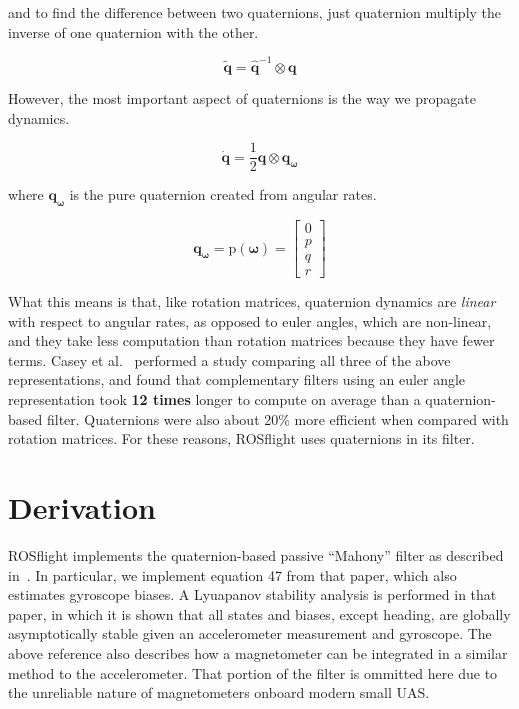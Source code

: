 \documentclass[paper=a4, fontsize=11pt]{scrartcl} %
\numberwithin{equation}{section} %
\numberwithin{figure}{section} %
\numberwithin{table}{section} %
\begin{document}
and to find the difference between two quaternions, just quaternion multiply the inverse of one quaternion with the other.

\begin{equation}
	\tilde{\bm{q}} = \hat{\bm{q}}^{-1} \otimes \bm{q}
\end{equation}

However, the most important aspect of quaternions is the way we propagate dynamics.

\begin{equation}
	\dot{\bm{q}} = \frac{1}{2} \bm{q} \otimes \bm{q_{\omega}}
\end{equation}

where $\bm{q_{\omega}}$ is the pure quaternion created from angular rates.

\begin{equation}
	\bm{q_{\omega}} = \textrm{p}(\bm{\omega}) =
			  \begin{bmatrix}
				0 \\
				p \\
				q \\
				r
			 \end{bmatrix}
\end{equation}

What this means is that, like rotation matrices, quaternion dynamics are \textit{linear} with respect to angular rates, as opposed to euler angles, which are non-linear, and they take less computation than rotation matrices because they have fewer terms.  Casey et al.~\cite{Casey2013} performed a study comparing all three of the above representations, and found that complementary filters using an euler angle representation took \textbf{12 times} longer to compute on average than a quaternion-based filter.  Quaternions were also about 20\% more efficient when compared with rotation matrices.  For these reasons, ROSflight uses quaternions in its filter.

\section{Derivation}

ROSflight implements the quaternion-based passive ``Mahony'' filter as described in~\cite{Mahony2007}.  In particular, we implement equation 47 from that paper, which also estimates gyroscope biases.  A Lyuapanov stability analysis is performed in that paper, in which it is shown that all states and biases, except heading, are globally asymptotically stable given an accelerometer measurement and gyroscope.  The above reference also describes how a magnetometer can be integrated in a similar method to the accelerometer.  That portion of the filter is ommitted here due to the unreliable nature of magnetometers onboard modern small UAS.
\end{document}
